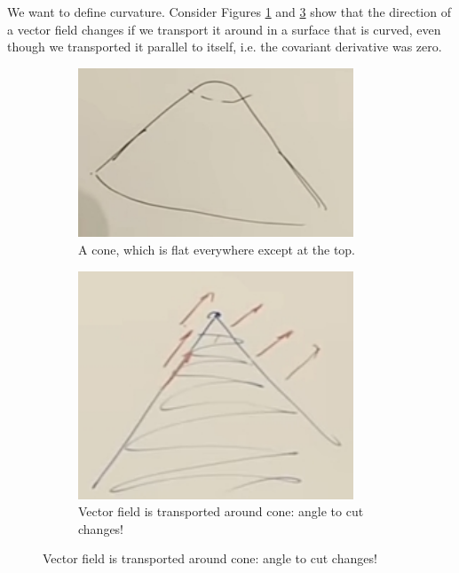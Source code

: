 \documentclass[]{article}
\begin{document}
We want to define curvature. Consider Figures \ref{fig:gr-4-curved-cone} and \ref{fig:gr-4-curved-cone-vector-field} show that the direction of a vector field changes if we transport it around in a surface that is curved, even though we transported it parallel to itself, i.e. the covariant derivative was zero.
\begin{figure}[H]
	\begin{center}
		\caption{Illustrating curvature}
		\begin{subfigure}[t]{0.4\textwidth}
			\caption{A cone, which is flat everywhere except at the top.}\label{fig:gr-4-curved-cone}
			\includegraphics[width=0.9\textwidth]{gr-4-curved-cone}
		\end{subfigure}
		\;
		\begin{subfigure}[t]{0.4\textwidth}
			\caption{Vector field is transported around cone: angle to cut changes!}\label{fig:gr-4-curved-cone-vector-field}
			\includegraphics[width=0.9\textwidth]{gr-4-curved-cone-vector-field}
		\end{subfigure}
	\end{center}
\end{figure}
\end{document}
